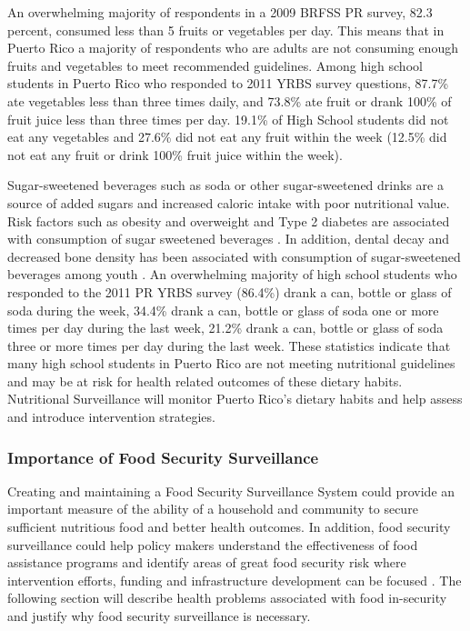 \documentclass[12pt,letterpaper]{report}
\begin{document}
An overwhelming majority of respondents in a 2009 BRFSS PR survey, 82.3 percent, consumed less than 5 fruits or vegetables per day. This means that in Puerto Rico a majority of respondents who are adults are not consuming enough fruits and vegetables to meet recommended guidelines. Among high school students in Puerto Rico who responded to 2011 YRBS survey questions, 87.7\% ate vegetables less than three times daily, and 73.8\% ate fruit or drank 100\% of fruit juice less than three times per day. 19.1\% of High School students did not eat any vegetables and 27.6\% did not eat any fruit within the week (12.5\% did not eat any fruit or drink 100\% fruit juice within the week).

Sugar-sweetened beverages such as soda or other sugar-sweetened drinks are a source of added sugars and increased caloric intake with poor nutritional value. Risk factors such as obesity and overweight and Type 2 diabetes are associated with consumption of sugar sweetened beverages \cite{vartanian2007effects}. In addition, dental decay and decreased bone density has been associated with consumption of sugar-sweetened beverages among youth \cite{whiting2001relationship, tahmassebi2006soft}. An overwhelming majority of high school students who responded to the 2011 PR YRBS survey (86.4\%) drank a can, bottle or glass of soda during the week, 34.4\% drank a can, bottle or glass of soda one or more times per day during the last week, 21.2\% drank a can, bottle or glass of soda three or more times per day during the last week. These statistics indicate that many high school students in Puerto Rico are not meeting nutritional guidelines and may be at risk for health related outcomes of these dietary habits. Nutritional Surveillance will monitor Puerto Rico's dietary habits and help assess and introduce intervention strategies.

\subsubsection{Importance of Food Security Surveillance}
Creating and maintaining a Food Security Surveillance System could provide an important measure of the ability of a household and community to secure sufficient nutritious food and better health outcomes. In addition, food security surveillance could help policy makers understand the effectiveness of food assistance programs and identify areas of great food security risk where intervention efforts, funding and infrastructure development can be focused \cite{bickel2000guide}. The following section will describe health problems associated with food in-security and justify why food security surveillance is necessary. 
\end{document}
